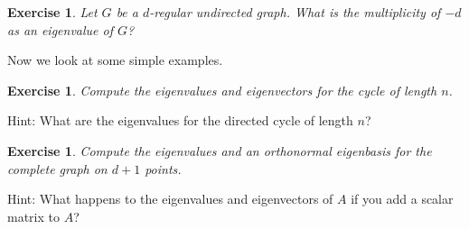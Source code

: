 \documentclass[12pt]{article}
\newtheorem{exercise}[theorem]{Exercise}
\begin{document}
\begin{exercise}
Let $G$ be a $d$-regular undirected graph. What is the multiplicity of $-d$
as an eigenvalue of $G$?
\end{exercise}

Now we look at some simple examples.

\begin{exercise}
Compute the eigenvalues and eigenvectors for the cycle of length $n$.
\end{exercise}

Hint: What are the eigenvalues for the directed cycle of length $n$?

\begin{exercise}
Compute the eigenvalues and an orthonormal eigenbasis for the complete graph
on $d+1$ points.
\end{exercise}

Hint: What happens to the eigenvalues and eigenvectors of $A$ if you add a
scalar matrix to $A$?
\end{document}
